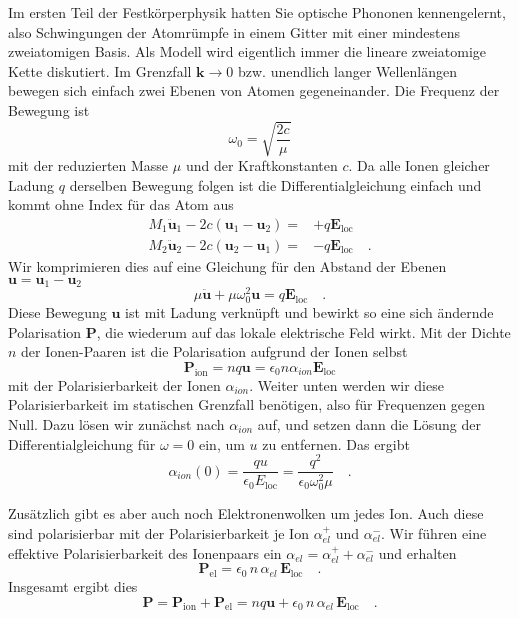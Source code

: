 Im ersten Teil der Festkörperphysik hatten Sie optische Phononen kennengelernt, also Schwingungen der Atomrümpfe in einem Gitter mit einer mindestens zweiatomigen Basis. Als Modell wird eigentlich immer die lineare zweiatomige Kette diskutiert. Im Grenzfall $\bm{k} \rightarrow 0$ bzw. unendlich langer Wellenlängen bewegen sich einfach zwei Ebenen von Atomen gegeneinander. Die Frequenz der Bewegung ist
\begin{equation}
    \omega_{0} = \sqrt{\frac{2c}{\mu}}
\end{equation}
mit der reduzierten Masse $\mu$ und der Kraftkonstanten $c$. Da alle Ionen gleicher Ladung $q$ derselben Bewegung folgen ist die Differentialgleichung  einfach und kommt ohne Index für das Atom aus
\begin{align}
    M_1 \ddot{\bm{u}}_1 - 2c (\bm{u}_1 - \bm{u}_2 )  =&  + q \bm{E}_\text{loc}  \\
    M_2 \ddot{\bm{u}}_2 - 2c (\bm{u}_2 - \bm{u}_1 )  =& - q \bm{E}_\text{loc}  \quad .
\end{align}
Wir komprimieren dies auf eine Gleichung für den Abstand der Ebenen $\bm{u} = \bm{u}_1 - \bm{u}_2$
\begin{equation}
    \mu \ddot{\bm{u}} + \mu \omega_{0}^2 \bm{u} =  q \bm{E}_\text{loc} \quad .
\end{equation}
Diese Bewegung  $\bm{u}$ ist mit Ladung verknüpft und bewirkt so eine sich ändernde Polarisation $\bm{P}$, die wiederum auf das lokale elektrische Feld wirkt. Mit der Dichte $n$ der Ionen-Paaren ist die Polarisation aufgrund der Ionen selbst 
\begin{equation}
    \bm{P}_\text{ion} = n q \bm{u} =\epsilon_0  n \alpha_{ion} \bm{E}_\text{loc} 
\end{equation}
mit der Polarisierbarkeit der Ionen $\alpha_{ion}$. Weiter unten werden wir diese Polarisierbarkeit im statischen Grenzfall benötigen, also für Frequenzen gegen Null. Dazu lösen wir zunächst nach $\alpha_{ion}$ auf, und setzen dann die Lösung der Differentialgleichung für $\omega = 0$ ein, um $u$ zu entfernen. Das ergibt
\begin{equation}
    \alpha_{ion}(0) = \frac{q u}{\epsilon_0 E_\text{loc}} = \frac{q^2}{\epsilon_0 \omega_0^2 \mu} \quad .
\end{equation}

Zusätzlich gibt es aber auch noch Elektronenwolken um jedes Ion. Auch diese sind polarisierbar mit der Polarisierbarkeit je Ion $\alpha_{el}^+$ und $\alpha_{el}^-$. Wir führen eine effektive Polarisierbarkeit des Ionenpaars ein $\alpha_{el} = \alpha_{el}^+ + \alpha_{el}^-$ und erhalten
\begin{equation}
    \bm{P}_\text{el} = \epsilon_0 \, n \, \alpha_{el} \, \bm{E}_\text{loc} \quad .
\end{equation} 
Insgesamt ergibt dies
\begin{equation}
    \bm{P} = \bm{P}_\text{ion}  +  \bm{P}_\text{el} =   n q \bm{u} +  \epsilon_0 \, n \, \alpha_{el} \, \bm{E}_\text{loc}   \quad .
    \label{eq:8_Pges_optische_Phononen}
\end{equation} 


